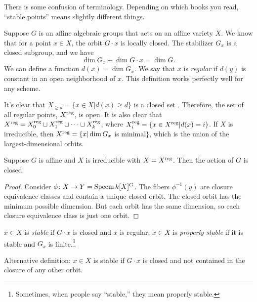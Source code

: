 
There is some confusion of terminology. Depending on which books you read, ``stable points'' means slightly different things.

Suppose $G$ is an affine algebraic groups that acts on an affine variety $X$. We know that for a point $x\in X$, the orbit $G\cdot x$ is locally closed. The stabilizer $G_x$ is a closed subgroup, and we have
\[
 \dim G_x + \dim G\cdot x = \dim G.
\]
We can define a function $d(x)=\dim G_x$. We say that $x$ is \emph{regular} if $d(y)$ is constant in an open neighborhood of $x$. This definition works perfectly well for any scheme.

It's clear that $X_{\ge d}=\{x\in X|d(x)\ge d\}$ is a closed set . Therefore, the set of all regular points, $X^{\mathrm{reg}}$, is open. It is also clear that $X^{\mathrm{reg}}=X^{\mathrm{reg}}_0\sqcup X_1^{\mathrm{reg}}\sqcup\cdots \sqcup X^{\mathrm{reg}}_k$, where $X^{\mathrm{reg}}_i=\{x\in X^{\mathrm{reg}}|d(x)=i\}$. If $X$ is irreducible, then $X^{\mathrm{reg}}=\{x|\dim G_x$ is minimal$\}$, which is the union of the largest-dimensional orbits.

\begin{proposition}
 Suppose $G$ is affine and $X$ is irreducible with $X=X^{\mathrm{reg}}$. Then the action of $G$ is closed.
\end{proposition}
\begin{proof}
 Consider $\phi\colon X\to Y=\operatorname{Specm} k[X]^G$. The fibers $\phi^{-1}(y)$ are closure equivalence classes and contain a unique closed orbit. The closed orbit has the minimum possible dimension. But each orbit has the same dimension, so each closure equivalence class is just one orbit.
 
\end{proof}
\begin{definition}
 $x\in X$ is \emph{stable} if $G\cdot x$ is closed and $x$ is regular. $x\in X$ is \emph{properly stable} if it is stable and $G_x$ is finite.\footnote{Sometimes, when people say ``stable,'' they mean properly stable.}
\end{definition}
\begin{remark}
 Alternative definition: $x\in X$ is stable if $G\cdot x$ is closed and not contained in the closure of any other orbit.  
\end{remark}

